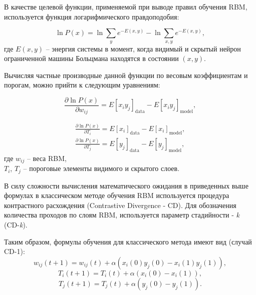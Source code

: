 \documentclass{thesisby}
\begin{document}
В качестве целевой функции, применяемой при выводе правил обучения RBM, используется функция логарифмического правдоподобия:
 
\begin{equation*}
    \ln{P(x)} = \ln{\sum_y e^{-E(x, y)}} - \ln{\sum_{x,y} e^{-E(x, y)}},
\end{equation*}
где $E(x, y)$ -- энергия системы в момент, когда видимый и скрытый нейрон ограниченной машины Больцмана находятся в состоянии $(x, y)$.
	
Вычисляя частные производные данной функции по весовым коэффициентам и порогам, можно прийти к следующим уравнениям:

\begin{equation*}
    \label{grad_weights}
	\frac{\partial \ln P(x)}{\partial w_{ij}}=E\left[x_iy_j\right]_{\text{data}}-E\left[x_iy_j\right]_{\text{model}},
\end{equation*}
 
\begin{equation*}
\label{grad_biases}
\begin{aligned}
	\frac{\partial \ln P(x)}{\partial T_i}=E\left[x_i\right]_{\text{data}}-E\left[x_i\right]_{\text{model}},\\
	\frac{\partial \ln P(x)}{\partial T_j}=E\left[y_j\right]_{\text{data}}-E\left[y_j\right]_{\text{model}},
\end{aligned}
\end{equation*}
где $w_{ij}$ -- веса RBM,\\
$T_i$, $T_j$ -- пороговые элементы видимого и скрытого слоев.

В силу сложности вычисления математического ожидания в приведенных выше формулах в классическом методе обучения RBM используется процедура контрастного расхождения (Contrastive Divergence - CD). Для обозначения количества проходов по слоям RBM, используется параметр стадийности - \textit{k} (CD-\textit{k}).

Таким образом, формулы обучения для классического метода имеют вид (случай CD-1):
\begin{equation*}
	w_{ij}(t+1)=w_{ij}(t)+\alpha(x_i(0)y_j(0)-x_i(1)y_j(1)),
\end{equation*}
\begin{equation*}
    T_i(t+1)=T_i(t)+\alpha(x_i(0)-x_i(1)),
\end{equation*}
\begin{equation*}
    T_j(t+1)=T_j(t)+\alpha(y_j(0)-y_j(1)).
\end{equation*}
 
\end{document}

